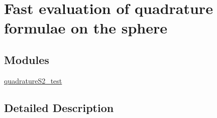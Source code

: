 \hypertarget{group__applications__quadratureS2}{\section{Fast evaluation of quadrature formulae on the sphere}
\label{group__applications__quadratureS2}
}
\subsection*{Modules}
\begin{DoxyCompactItemize}
\item 
\hyperlink{group__applications__quadratureS2__test}{quadrature\-S2\-\_\-test}
\end{DoxyCompactItemize}


\subsection{Detailed Description}
